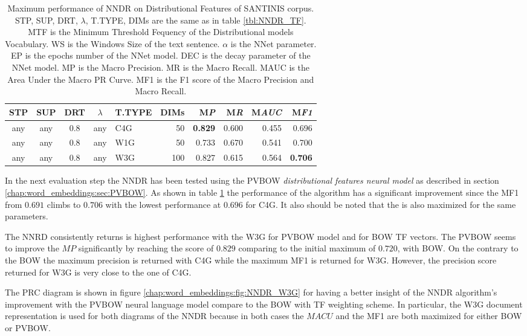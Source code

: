 \begin{table}
\center
\begin{tabular}{cccclrrrrr}
\hline
STP & SUP & DRT & $\lambda$ & T.TYPE & DIMs & M\emph{P} & M\emph{R} & M\emph{AUC} & M\emph{F1} \\
\hline
any & any & 0.8 & any & C4G & 50 & \textbf{0.829} & 0.600 & 0.455 & 0.696 \\
any & any & 0.8 & any & W1G & 50 & 0.733 & 0.670 & 0.541 & 0.700 \\
any & any & 0.8 & any & W3G & 100 & 0.827 & 0.615 & 0.564 & \textbf{0.706} \\
\hline
\end{tabular}
\caption {Maximum performance of NNDR on Distributional Features of SANTINIS corpus. STP, SUP, DRT, $\lambda$, T.TYPE, DIMs are the same as in table \ref{tbl:NNDR_TF}. MTF is the Minimum Threshold Fequency of the Distributional models Vocabulary. WS is the Windows Size of the text sentence. $\alpha$ is the NNet parameter. EP is the epochs number of the NNet model. DEC is the decay parameter of the NNet model. MP is the Macro Precision. MR is the Macro Recall. MAUC is the Area Under the Macro PR Curve. MF1 is the F1 score of the Macro Precision and Macro Recall.}
\label{chap:word_embeddings:tbl:NNDR_PVBOW}
\end{table}

In the next evaluation step the NNDR has been tested using the PVBOW \textit{distributional features neural model }as described in section \ref{chap:word_embeddings:sec:PVBOW}. As shown in table \ref{chap:word_embeddings:tbl:NNDR_PVBOW} the performance of the algorithm has a significant improvement since the  MF1 from $0.691$ climbs to $0.706$ with the lowest performance at $0.696$ for C4G. It also should be noted that the is also maximized for the same parameters. 

The NNRD consistently returns is highest performance with the W3G for PVBOW model and for BOW TF vectors. The PVBOW seems to improve the $MP$ significantly by reaching the score of $0.829$ comparing to the initial maximum of $0.720$, with BOW. On the contrary to the BOW the maximum precision is returned with C4G while the maximum MF1 is returned for W3G. However, the precision score returned for W3G is very close to the one of C4G.

The PRC diagram is shown in figure  \ref{chap:word_embeddings:fig:NNDR_W3G} for having a better insight of the NNDR algorithm's improvement with the PVBOW neural language model compare to the BOW with TF weighting scheme. In particular, the W3G document representation is used for both diagrams of the NNDR because in both cases the $MACU$ and the MF1 are both maximized for either BOW or PVBOW.

